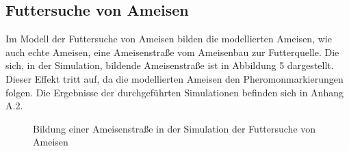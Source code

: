 \documentclass[a4paper, 11pt]{article}
\begin{document}
\subsection{Futtersuche von Ameisen}
Im Modell der Futtersuche von Ameisen bilden die modellierten Ameisen, wie auch echte Ameisen, eine Ameisenstraße vom Ameisenbau zur Futterquelle. Die sich, in der Simulation, bildende Ameisenstraße ist in Abbildung 5 dargestellt. Dieser Effekt tritt auf, da die modellierten Ameisen den Pheromonmarkierungen folgen. Die Ergebnisse der durchgeführten Simulationen befinden sich in Anhang A.2.\newline\newline
\begin{figure}[h]
	\begin{center}
	\end{center}
	\hspace{1in}\parbox{4in}{\caption[Bildung einer Ameisenstraße in der Simulation der Futtersuche von Ameisen]{Bildung einer Ameisenstraße in der Simulation der Futtersuche von Ameisen}}
	\label{acomodabb1}
\end{figure}
\end{document}
